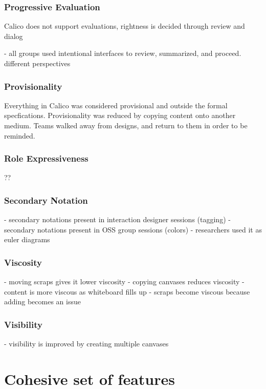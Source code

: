 \subsubsection{Progressive Evaluation}
Calico does not support evaluations, rightness is decided through review and dialog

- all groups used intentional interfaces to review, summarized, and proceed. different perspectives

\subsubsection{Provisionality}

Everything in Calico was considered provisional and outside the formal specfications. Provisionality was reduced by copying content onto another medium. Teams walked away from designs, and return to them in order to be reminded.

\subsubsection{Role Expressiveness}

??

\subsubsection{Secondary Notation}

- secondary notations present in interaction designer sessions (tagging)
- secondary notations present in OSS group sessions (colors)
- researchers used it as euler diagrams

\subsubsection{Viscosity}

- moving scraps gives it lower viscosity
- copying canvases reduces viscosity
- content is more viscous as whiteboard fills up
- scraps become viscous because adding becomes an issue

\subsubsection{Visibility}

- visibility is improved by creating multiple canvases

\section{Cohesive set of features}

